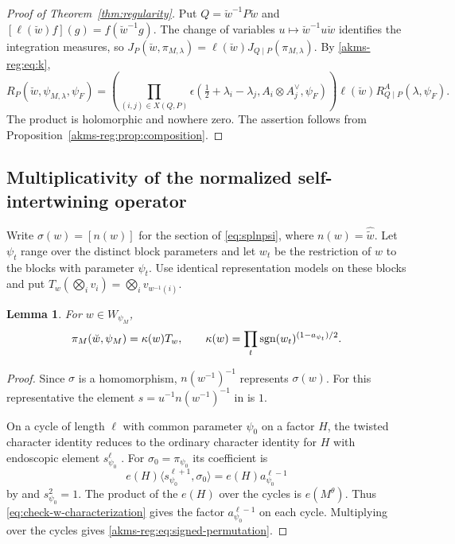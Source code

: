\documentclass[11pt,reqno]{amsart}
\theoremstyle{plain}
\newtheorem{lem}[thm]{Lemma}
\theoremstyle{definition}
\newcommand{\sgn}{\tu{sgn}}
\newcommand{\tu}{\textup}
\numberwithin{equation}{subsection}
\begin{document}
\begin{proof}[Proof of Theorem~\ref{thm:regularity}]
Put $Q=\breve w^{-1}P\breve w$ and
$[\ell(\breve w)f](g)=f(\breve w^{-1}g)$.
The change of variables $u\mapsto\breve w^{-1}u\breve w$ identifies
the integration measures, so
$J_P(\breve w,\pi_{M,\lambda})=\ell(\breve w)J_{Q\mid P}(\pi_{M,\lambda})$.
By \eqref{akms-reg:eq:k},
\[
 R_P(\breve w,\psi_{M,\lambda},\psi_F)
 =
 \left(\prod_{(i,j)\in X(Q,P)}
   \epsilon(\tfrac12+\lambda_i-\lambda_j,
             A_i\otimes A_j^\vee,\psi_F)\right)
 \ell(\breve w)R^A_{Q\mid P}(\lambda,\psi_F).
\]
The product is holomorphic and nowhere zero. The assertion follows
from Proposition~\ref{akms-reg:prop:composition}.
\end{proof}

\subsection{Multiplicativity of the normalized self-intertwining operator}
\label{akms-reg:sec:multiplicativity}

Write $\sigma(w)=[n(w)]$ for the section of \eqref{eq:splnpsi},
where $n(w)=\widehat{\tilde w}$. Let $\psi_t$ range over the
distinct block parameters and let $w_t$ be the restriction of $w$
to the blocks with parameter $\psi_t$. Use identical representation
models on these blocks and put
$T_w(\bigotimes_i v_i)=\bigotimes_i v_{w^{-1}(i)}$.

\begin{lem}\label{akms-reg:lem:pi-composition}
For $w\in W_{\psi_M}$,
\begin{equation}\label{akms-reg:eq:signed-permutation}
 \pi_M(\breve w,\psi_M)=\kappa(w)T_w,\qquad
 \kappa(w)=\prod_t \sgn (w_t)^{(1-a_{\psi_t})/2}.
\end{equation}
\end{lem}
\begin{proof}
Since $\sigma$ is a homomorphism, $n(w^{-1})^{-1}$ represents
$\sigma(w)$. For this representative the element
$s=u^{-1}n(w^{-1})^{-1}$ in \cite[\S2.4.3]{KMSW} is $1$.

On a cycle of length $\ell$ with common parameter $\psi_0$ on a
factor $H$, the twisted character identity reduces to the ordinary
character identity for $H$ with endoscopic element $s_{\psi_0}^{\ell}$
\cite[\S1.1.3, Cor.~1.1.6, Lem.~1.1.7]{KMSW}. For
$\sigma_0=\pi_{\psi_0}$ its coefficient is
\[
 e(H)\langle s_{\psi_0}^{\ell+1},\sigma_0\rangle
 =e(H)a_{\psi_0}^{\ell-1}
\]
by \cite[Thm.~1.6.1(4), (1.6.1)]{KMSW} and $s_{\psi_0}^2=1$.
The product of the $e(H)$ over the cycles is $e(M^\theta)$.
Thus \eqref{eq:check-w-characterization} gives the factor
$a_{\psi_0}^{\ell-1}$ on each cycle. Multiplying over the cycles
gives \eqref{akms-reg:eq:signed-permutation}.
\end{proof}
\end{document}
